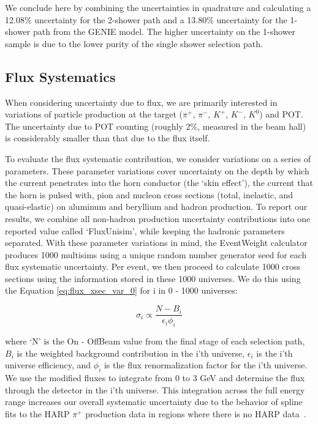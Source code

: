 We conclude here by combining the uncertainties in quadrature and calculating a 12.08\% uncertainty for the 2-shower path and a 13.80\% uncertainty for the 1-shower path from the GENIE model.  The higher uncertainty on the 1-shower sample is due to the lower purity of the single shower selection path.

\clearpage
\subsection{Flux Systematics}
When considering uncertainty due to flux, we are primarily interested in variations of particle production at the target ($\pi^+$, $\pi^-$, $K^+$, $K^-$, $K^0$) and POT.  The uncertainty due to POT counting (roughly 2\%, measured in the beam hall) is considerably smaller than that due to the flux itself. 
\par To evaluate the flux systematic contribution, we consider variations on a series of parameters.  These parameter variations cover uncertainty on the depth by which the current penetrates into the horn conductor (the ‘skin effect’), the current that the horn is pulsed with, pion and nucleon cross sections
(total, inelastic, and quasi-elastic) on aluminum and beryllium and hadron production. To report our results, we combine all non-hadron production uncertainty contributions into one reported value called `FluxUnisim', while keeping the hadronic parameters separated. With these parameter variations in mind, the EventWeight calculator produces 1000 multisims using a unique random number generator seed for each flux systematic uncertainty. Per event, we then proceed to calculate 1000 cross sections using the information stored in these 1000 universes.  We do this using the Equation \ref{eq:flux_xsec_var_0} for i in 0 - 1000 universes:

\begin{equation} \label{eq:flux_xsec_var_0}
  \sigma_i \propto \frac{N - B_i}{\epsilon_i \phi_i} 
\end{equation}

\noindent where `N' is the On - OffBeam value from the final stage of each selection path, $B_i$ is the weighted background contribution in the i'th universe, $\epsilon_i$ is the i'th universe efficiency, and $\phi_i$ is the flux renormalization factor for the i'th universe.  We use the modified fluxes to integrate from 0 to 3 GeV and determine the flux through the detector in the i'th universe. This integration across the full energy range increases our overall systematic uncertainty due to the behavior of spline fits to the HARP $\pi^{+}$ production data in regions where there is no HARP data~\cite{bib:flux_uncertainty_tn}. 

